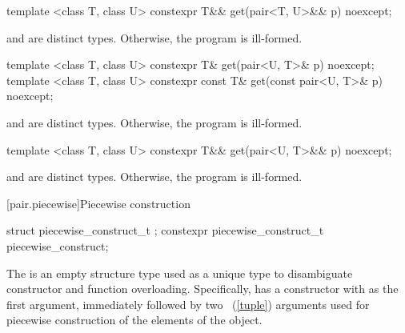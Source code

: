%
%
\begin{itemdecl}
template <class T, class U>
  constexpr T&& get(pair<T, U>&& p) noexcept;
\end{itemdecl}
\begin{itemdescr}
\pnum
\requires {} and  are distinct types. Otherwise, the program is ill-formed.

\pnum
\returns {}
\end{itemdescr}

%
%
\begin{itemdecl}
template <class T, class U>
  constexpr T& get(pair<U, T>& p) noexcept;
template <class T, class U>
  constexpr const T& get(const pair<U, T>& p) noexcept;
\end{itemdecl}
\begin{itemdescr}

\pnum
\requires {} and  are distinct types. Otherwise, the program is ill-formed.

\pnum
\returns {}
\end{itemdescr}

%
%
\begin{itemdecl}
template <class T, class U>
  constexpr T&& get(pair<U, T>&& p) noexcept;
\end{itemdecl}
\begin{itemdescr}

\pnum
\requires {} and  are distinct types. Otherwise, the program is ill-formed.

\pnum
\returns {}
\end{itemdescr}

[pair.piecewise]{Piecewise construction}

%
%
\begin{itemdecl}
struct piecewise_construct_t { };
constexpr piecewise_construct_t piecewise_construct{};
\end{itemdecl}

\pnum
The   is an empty structure type
used as a unique type to disambiguate constructor and function overloading. Specifically,
 has a constructor with  as the
first argument, immediately followed by two ~(\ref{tuple}) arguments used
for piecewise construction of the elements of the  object.

